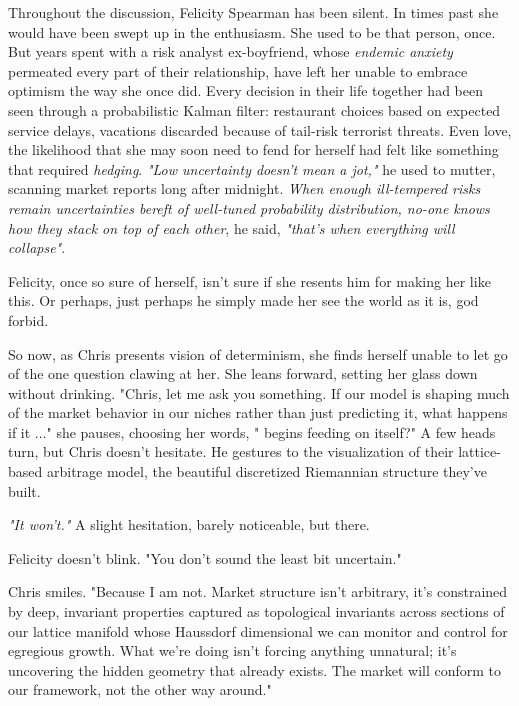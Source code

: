 \smallskip

Throughout the discussion, Felicity Spearman has been silent. In times past she would have been swept up in the enthusiasm. She used to be that person, once. But years spent with a risk analyst ex-boyfriend, whose \textit{endemic anxiety} permeated every part of their relationship, have left her unable to embrace optimism the way she once did. Every decision in their life together had been seen through a probabilistic Kalman filter: restaurant choices based on expected service delays, vacations discarded because of tail-risk terrorist threats. Even love, the likelihood that she may soon need to fend for herself had felt like something that required \textit{hedging}.  \textit{"Low uncertainty doesn’t mean a jot,"} he used to mutter, scanning market reports long after midnight. \textit{When enough ill-tempered risks remain uncertainties bereft of well-tuned probability distribution, no-one knows how they stack on top of each other}, he said, \textit{"that’s when everything will collapse"}. 

\smallskip

Felicity, once so sure of herself, isn’t sure if she resents him for making her like this. Or perhaps, just perhaps he simply made her see the world as it is, god forbid.

\smallskip

So now, as Chris presents vision of determinism, she finds herself unable to let go of the one question clawing at her. She leans forward, setting her glass down without drinking. "Chris, let me ask you something. If our model is shaping much of the market behavior in our niches rather than just predicting it, what happens if it ..." she pauses, choosing her words, " begins feeding on itself?" A few heads turn, but Chris doesn’t hesitate. He gestures to the visualization of their lattice-based arbitrage model, the beautiful discretized Riemannian structure they’ve built.

\smallskip

\textit{"It won’t."} A slight hesitation, barely noticeable, but there.

\smallskip

Felicity doesn’t blink. "You don't sound the least bit uncertain."

\smallskip

Chris smiles. "Because I am not. Market structure isn’t arbitrary, it’s constrained by deep, invariant properties captured as topological invariants across sections of our lattice manifold whose Haussdorf dimensional we can monitor and control for egregious growth. What we’re doing isn’t forcing anything unnatural; it’s uncovering the hidden geometry that already exists. The market will conform to our framework, not the other way around."

